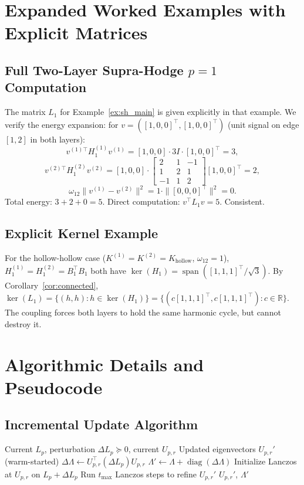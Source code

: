 \documentclass[11pt]{article}
\theoremstyle{definition}
\theoremstyle{remark}
\newcommand{\R}{\mathbb{R}}
\newcommand{\Up}{U_{p,r}}
\DeclareMathOperator{\diag}{diag}
\DeclareMathOperator{\spn}{span}
\begin{document}
\clearpage
\section{Expanded Worked Examples with Explicit Matrices}
\label{app:examples}

\subsection{Full Two-Layer Supra-Hodge $p=1$ Computation}

The matrix $L_1$ for Example~\ref{ex:sh_main} is given explicitly in that
example. We verify the energy expansion: for $v=([1,0,0]^\top,[1,0,0]^\top)$
(unit signal on edge $[1,2]$ in both layers):
\[
  v^{(1)\top}H_1^{(1)}v^{(1)} = [1,0,0]\cdot 3I\cdot[1,0,0]^\top = 3,
\]
\[
  v^{(2)\top}H_1^{(2)}v^{(2)} = [1,0,0]\cdot\begin{bmatrix}2&1&-1\\1&2&1\\-1&1&2\end{bmatrix}[1,0,0]^\top = 2,
\]
\[
  \omega_{12}\|v^{(1)}-v^{(2)}\|^2 = 1\cdot\|[0,0,0]^\top\|^2 = 0.
\]
Total energy: $3+2+0=5$. Direct computation: $v^\top L_1 v = 5$. Consistent.

\subsection{Explicit Kernel Example}

For the hollow-hollow case ($K^{(1)}=K^{(2)}=K_{\mathrm{hollow}}$, $\omega_{12}=1$),
$H_1^{(1)}=H_1^{(2)}=B_1^\top B_1$ both have $\ker(H_1)=\spn([1,1,1]^\top/\sqrt{3})$.
By Corollary~\ref{cor:connected}, $\ker(L_1)=\{(h,h):h\in\ker(H_1)\}=
\{(c[1,1,1]^\top,c[1,1,1]^\top):c\in\R\}$. The coupling forces both layers to
hold the same harmonic cycle, but cannot destroy it.

\clearpage
\section{Algorithmic Details and Pseudocode}
\label{app:algorithms}

\subsection{Incremental Update Algorithm}

\begin{algorithm}[h]
\caption{Incremental Supra-Hodge Spectral Update}
\label{alg:update}
\begin{algorithmic}[1]
\Require Current $L_p$, perturbation $\Delta L_p\succeq 0$, current $\Up$
\Ensure Updated eigenvectors $\Up'$ (warm-started)
\State $\Delta\Lambda \gets \Up^\top(\Delta L_p)\Up$ 
\State $\Lambda' \gets \Lambda + \diag(\Delta\Lambda)$ 
\State Initialize Lanczos at $\Up$ on $L_p+\Delta L_p$
\State Run $t_{\max}$ Lanczos steps to refine $\Up'$
\State \Return $\Up'$, $\Lambda'$
\end{algorithmic}
\end{algorithm}
\end{document}
